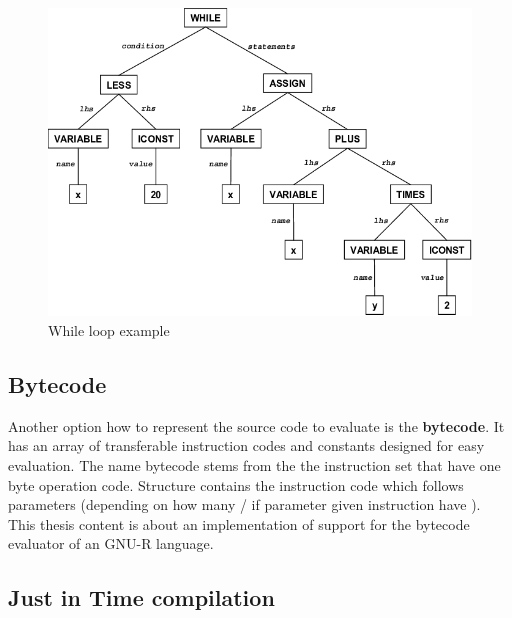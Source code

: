 \documentclass[thesis=M,english]{FITthesis}[2018/10/20]
\begin{document}

\begin{figure}[H]\centering
	\includegraphics{Abstract-syntax-tree-of-the-while-loop}
	\caption{While loop example}\label{fig:ast-while}
\end{figure}

\subsection{Bytecode}\label{BC}

Another option how to represent the source code to evaluate is the \textbf{bytecode}. It has an array of transferable instruction codes and constants designed for easy evaluation. The name bytecode stems from the the instruction set that have one byte operation code. Structure contains the instruction code which follows parameters (depending on how many / if parameter given instruction have ). This thesis content is about an implementation of support for the bytecode evaluator of an GNU-R language.

\subsection{Just in Time compilation}\label{JIT}
\end{document}
